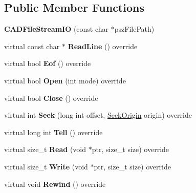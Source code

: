 \subsection*{Public Member Functions}
\begin{DoxyCompactItemize}
\item 
{\bfseries C\+A\+D\+File\+Stream\+IO} (const char $\ast$psz\+File\+Path)\hypertarget{class_c_a_d_file_stream_i_o_aac4069683e72c7d74edf95bafa829a02}{}\label{class_c_a_d_file_stream_i_o_aac4069683e72c7d74edf95bafa829a02}

\item 
virtual const char $\ast$ {\bfseries Read\+Line} () override\hypertarget{class_c_a_d_file_stream_i_o_a8cf14e8b59f3b51964b7cc9d0bf10fc2}{}\label{class_c_a_d_file_stream_i_o_a8cf14e8b59f3b51964b7cc9d0bf10fc2}

\item 
virtual bool {\bfseries Eof} () override\hypertarget{class_c_a_d_file_stream_i_o_aa8ec0880bf9a6d2e86f6863926d90906}{}\label{class_c_a_d_file_stream_i_o_aa8ec0880bf9a6d2e86f6863926d90906}

\item 
virtual bool {\bfseries Open} (int mode) override\hypertarget{class_c_a_d_file_stream_i_o_aa7a02c8adebcb02b098b53967ea04ea4}{}\label{class_c_a_d_file_stream_i_o_aa7a02c8adebcb02b098b53967ea04ea4}

\item 
virtual bool {\bfseries Close} () override\hypertarget{class_c_a_d_file_stream_i_o_acc82311b6d85e44d998f941cd075febf}{}\label{class_c_a_d_file_stream_i_o_acc82311b6d85e44d998f941cd075febf}

\item 
virtual int {\bfseries Seek} (long int offset, \hyperlink{class_c_a_d_file_i_o_ac02f709414ed2d228f8dfdabb4eb1b4f}{Seek\+Origin} origin) override\hypertarget{class_c_a_d_file_stream_i_o_a6b7f640fc6ee987ecc76c37dce2e8668}{}\label{class_c_a_d_file_stream_i_o_a6b7f640fc6ee987ecc76c37dce2e8668}

\item 
virtual long int {\bfseries Tell} () override\hypertarget{class_c_a_d_file_stream_i_o_ab7c16d1785e12909a1c5374f007a69db}{}\label{class_c_a_d_file_stream_i_o_ab7c16d1785e12909a1c5374f007a69db}

\item 
virtual size\+\_\+t {\bfseries Read} (void $\ast$ptr, size\+\_\+t size) override\hypertarget{class_c_a_d_file_stream_i_o_a7c294d9ecca566774a4edf2b6d154ade}{}\label{class_c_a_d_file_stream_i_o_a7c294d9ecca566774a4edf2b6d154ade}

\item 
virtual size\+\_\+t {\bfseries Write} (void $\ast$ptr, size\+\_\+t size) override\hypertarget{class_c_a_d_file_stream_i_o_a6898435bc03c202769bd73d3db362c66}{}\label{class_c_a_d_file_stream_i_o_a6898435bc03c202769bd73d3db362c66}

\item 
virtual void {\bfseries Rewind} () override\hypertarget{class_c_a_d_file_stream_i_o_aaee39d2f0a12625895f31f2f548f7b93}{}\label{class_c_a_d_file_stream_i_o_aaee39d2f0a12625895f31f2f548f7b93}

\end{DoxyCompactItemize}
